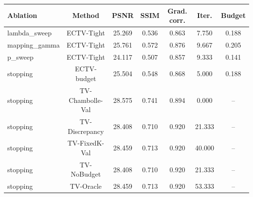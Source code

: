 \begin{tabular}{lcccccc}
\toprule
Ablation & Method & PSNR & SSIM & Grad. corr. & Iter. & Budget \\
\midrule
lambda\_sweep & ECTV-Tight & 25.269 & 0.536 & 0.863 & 7.750 & 0.188 \\
mapping\_gamma & ECTV-Tight & 25.761 & 0.572 & 0.876 & 9.667 & 0.205 \\
p\_sweep & ECTV-Tight & 24.117 & 0.507 & 0.857 & 9.333 & 0.141 \\
stopping & ECTV-budget & 25.504 & 0.548 & 0.868 & 5.000 & 0.188 \\
stopping & TV-Chambolle-Val & 28.575 & 0.741 & 0.894 & 0.000 & -- \\
stopping & TV-Discrepancy & 28.408 & 0.710 & 0.920 & 21.333 & -- \\
stopping & TV-FixedK-Val & 28.459 & 0.713 & 0.920 & 40.000 & -- \\
stopping & TV-NoBudget & 28.408 & 0.710 & 0.920 & 21.333 & -- \\
stopping & TV-Oracle & 28.459 & 0.713 & 0.920 & 53.333 & -- \\
\bottomrule
\end{tabular}
